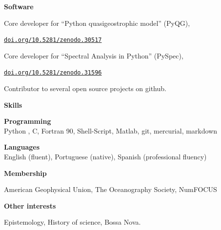 \documentclass[a4paper,11pt,final]{memoir}
\newcommand{\Sep}{\vspace{1.25em}}
\newcommand{\SmallSep}{\vspace{0.5em}}
\newcommand{\CVSection}[1]
    {\Large\textbf{#1}\par
    \SmallSep\normalsize\normalfont}
\newcommand{\CVItem}[1]
    {\textbf{\color{NavyBlue} #1}}
\begin{document}
\Sep

%
%

\CVSection{Software}

Core developer for ``Python quasigeostrophic model'' (PyQG),

\href{http://dx.doi.org/10.5281/zenodo.30517}{\texttt{doi.org/10.5281/zenodo.30517}}

\SmallSep

Core developer for ``Spectral Analysis in Python'' (PySpec),

\SmallSep

\href{http://dx.doi.org/10.5281/zenodo.31596}{\texttt{doi.org/10.5281/zenodo.31596}}

\SmallSep

Contributor to several open source projects on github.

\Sep


\Sep

\CVSection{Skills}

\CVItem{Programming}\\
Python , C, Fortran 90, Shell-Script, Matlab, git, mercurial, markdown

\SmallSep

\CVItem{Languages}\\
English (fluent), Portuguese (native), Spanish (professional fluency)

\Sep

\CVSection{Membership}

 American Geophysical Union, The Oceanography Society, NumFOCUS

\Sep

\CVSection{Other interests}

Epistemology, History of science, Bossa Nova.

%
%
%
%
%
%
%
%
\end{document}
